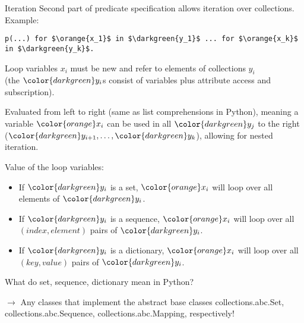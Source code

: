 \documentclass[%
beamer,%
english,%
10pt,%
]{beamer}
\newcommand{\blue}[1]{{\color{blue}#1}}
\newcommand{\orange}[1]{{\color{orange}#1}}
\newcommand{\darkgreen}[1]{{\color{darkgreen}#1}}
\begin{document}
\begin{frame}[fragile]{Iteration}
    Second part of predicate specification allows iteration over \darkgreen{collections}.
    Example:
    \begin{lstlisting}[escapechar=`,mathescape,basicstyle=\footnotesize,moredelim={**[is][\color{blue}]{@1}{@}},moredelim={**[is][\color{orange}]{@2}{@}},moredelim={**[is][\color{darkgreen}]{@3}{@}},moredelim={**[is][\color{red}]{@4}{@}}]
        p(...) for $\orange{x_1}$ in $\darkgreen{y_1}$ ... for $\orange{x_k}$ in $\darkgreen{y_k}$.
    \end{lstlisting}

    \orange{Loop variables $x_i$} must be new %
    and refer to elements
    of \darkgreen{collections $y_i$} \\
    (the $\darkgreen{y_i}$s consist of variables plus attribute access and subscription).

    \medskip
    Evaluated from left to right (same as list comprehensions in Python),
    meaning a variable $\orange{x_i}$ can be used in all $\darkgreen{y_j}$ to the right ($\darkgreen{y_{i+1}},\dots,\darkgreen{y_k}$),
    allowing for nested iteration.

    \medskip
    Value of the \orange{loop variables}:
    \begin{itemize}
        \item If $\darkgreen{y_i}$ is a set, $\orange{x_i}$ will loop over all elements of $\darkgreen{y_i}$.
        \item If $\darkgreen{y_i}$ is a sequence, $\orange{x_i}$ will loop over all $(\mathit{index},\mathit{element})$ pairs of $\darkgreen{y_i}$.
        \item If $\darkgreen{y_i}$ is a dictionary, $\orange{x_i}$ will loop over all $(\mathit{key},\mathit{value})$ pairs of $\darkgreen{y_i}$.
    \end{itemize}

    \medskip
    What do \blue{set}, \blue{sequence}, \blue{dictionary} mean in Python?

    $\rightarrow$ Any classes that implement the abstract base classes \blue{collections.abc.Set}, \blue{collections.abc.Sequence}, \blue{collections.abc.Mapping}, respectively!
\end{frame}
\end{document}
